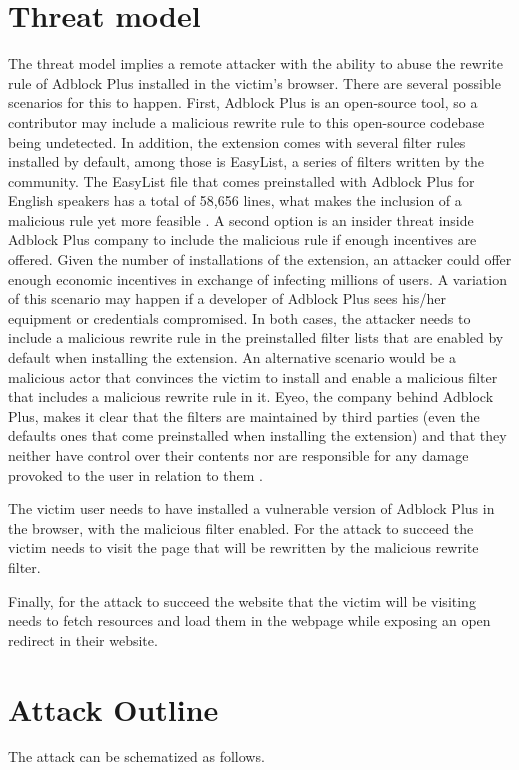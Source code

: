 \documentclass[conference]{IEEEtran}
\begin{document}
\section{Threat model}
The threat model implies a remote attacker with the ability to abuse the rewrite rule of Adblock Plus installed in the victim's browser. There are several possible scenarios for this to happen. First, Adblock Plus is an open-source tool, so a contributor may include a malicious rewrite rule to this open-source codebase being undetected. In addition, the extension comes with several filter rules installed by default, among those is EasyList, a series of filters written by the community. The EasyList file that comes preinstalled with Adblock Plus for English speakers has a total of 58,656 lines, what makes the inclusion of a malicious rule yet more feasible \cite{EasyList}. A second option is an insider threat inside Adblock Plus company to include the malicious rule if enough incentives are offered. Given the number of installations of the extension, an attacker could offer enough economic incentives in exchange of infecting millions of users. A variation of this scenario may happen if a developer of Adblock Plus sees his/her equipment or credentials compromised. In both cases, the attacker needs to include a malicious rewrite rule in the preinstalled filter lists that are enabled by default when installing the extension. 
An alternative scenario would be a malicious actor that convinces the victim to install and enable a malicious filter that includes a malicious rewrite rule in it. Eyeo, the company behind Adblock Plus, makes it clear that the filters are maintained by third parties (even the defaults ones that come preinstalled when installing the extension) and that they neither have control over their contents nor are responsible for any damage provoked to the user in relation to them \cite{abp_suscriptions}.

The victim user needs to have installed a vulnerable version of Adblock Plus in the browser, with the malicious filter enabled. For the attack to succeed the victim needs to visit the page that will be rewritten by the malicious rewrite filter.	

Finally, for the attack to succeed the website that the victim will be visiting needs to fetch resources and load them in the webpage while exposing an open redirect in their website.

\section{Attack Outline}
The attack can be schematized as follows.
\end{document}
